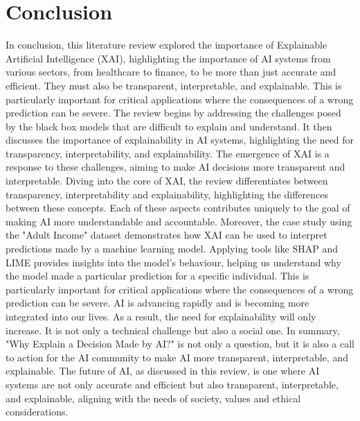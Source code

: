 \documentclass[10pt,journal,compsoc]{IEEEtran}
\begin{document}
\section{Conclusion}
In conclusion, this literature review explored the importance of Explainable Artificial Intelligence (XAI), highlighting the importance of AI systems from various sectors, from healthcare to finance, to be more than just accurate and efficient.
They must also be transparent, interpretable, and explainable. This is particularly important for critical applications where the consequences of a wrong prediction can be severe. 
The review begins by addressing the challenges posed by the black box models that are difficult to explain and understand. It then discusses the importance of explainability in AI systems, highlighting the need for transparency, interpretability, and explainability.
The emergence of XAI is a response to these challenges, aiming to make AI decisions more transparent and interpretable. Diving into the core of XAI, the review differentiates between transparency, interpretability and explainability, highlighting the differences between these concepts.
Each of these aspects contributes uniquely to the goal of making AI more understandable and accountable.
Moreover, the case study using the "Adult Income" dataset demonstrates how XAI can be used to interpret predictions made by a machine learning model. Applying tools like SHAP and LIME provides insights into the model's behaviour, helping us understand why the model made a particular prediction for a specific individual.
This is particularly important for critical applications where the consequences of a wrong prediction can be severe.
AI is advancing rapidly and is becoming more integrated into our lives. As a result, the need for explainability will only increase. 
It is not only a technical challenge but also a social one. 
In summary, "Why Explain a Decision Made by AI?" is not only a question, but it is also a call to action for the AI community to make AI more transparent, interpretable, and explainable. The future of AI, as discussed in this review, is one where AI systems are not only accurate and efficient but also transparent, interpretable, and explainable, aligning with the needs of society, values and ethical considerations.



\printbibliography
\end{document}
